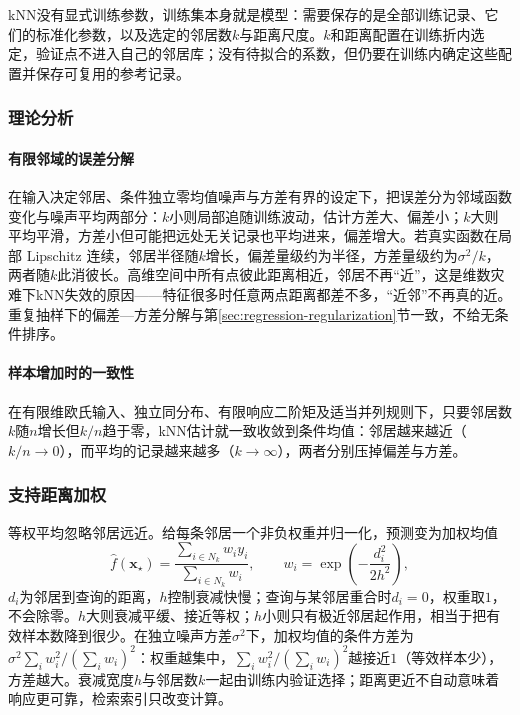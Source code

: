 kNN没有显式训练参数，训练集本身就是模型：需要保存的是全部训练记录、它们的标准化参数，以及选定的邻居数$k$与距离尺度。$k$和距离配置在训练折内选定，验证点不进入自己的邻居库；没有待拟合的系数，但仍要在训练内确定这些配置并保存可复用的参考记录。

\subsubsection{理论分析}
\label{sec:regression-knn-theory}

\paragraph{有限邻域的误差分解}

在输入决定邻居、条件独立零均值噪声与方差有界的设定下，把误差分为邻域函数变化与噪声平均两部分：$k$小则局部追随训练波动，估计方差大、偏差小；$k$大则平均平滑，方差小但可能把远处无关记录也平均进来，偏差增大。若真实函数在局部 Lipschitz 连续，邻居半径随$k$增长，偏差量级约为半径，方差量级约为$\sigma^2/k$，两者随$k$此消彼长。高维空间中所有点彼此距离相近，邻居不再“近”，这是维数灾难下kNN失效的原因——特征很多时任意两点距离都差不多，“近邻”不再真的近。重复抽样下的偏差—方差分解与第\ref{sec:regression-regularization}节一致，不给无条件排序。

\paragraph{样本增加时的一致性}

在有限维欧氏输入、独立同分布、有限响应二阶矩及适当并列规则下，只要邻居数$k$随$n$增长但$k/n$趋于零，kNN估计就一致收敛到条件均值：邻居越来越近（$k/n\to0$），而平均的记录越来越多（$k\to\infty$），两者分别压掉偏差与方差。

\subsubsection{支持距离加权}
\label{sec:regression-knn-weighted}

等权平均忽略邻居远近。给每条邻居一个非负权重并归一化，预测变为加权均值
\[
  \widehat f(\bm{x}_\star)=\frac{\sum_{i\in N_k}w_i y_i}{\sum_{i\in N_k}w_i},
  \qquad
  w_i=\exp\!\left(-\frac{d_i^2}{2h^2}\right),
\]
$d_i$为邻居到查询的距离，$h$控制衰减快慢；查询与某邻居重合时$d_i=0$，权重取$1$，不会除零。$h$大则衰减平缓、接近等权；$h$小则只有极近邻居起作用，相当于把有效样本数降到很少。在独立噪声方差$\sigma^2$下，加权均值的条件方差为$\sigma^2\sum_i w_i^2/(\sum_i w_i)^2$：权重越集中，$\sum_i w_i^2/(\sum_i w_i)^2$越接近$1$（等效样本少），方差越大。衰减宽度$h$与邻居数$k$一起由训练内验证选择；距离更近不自动意味着响应更可靠，检索索引只改变计算。

